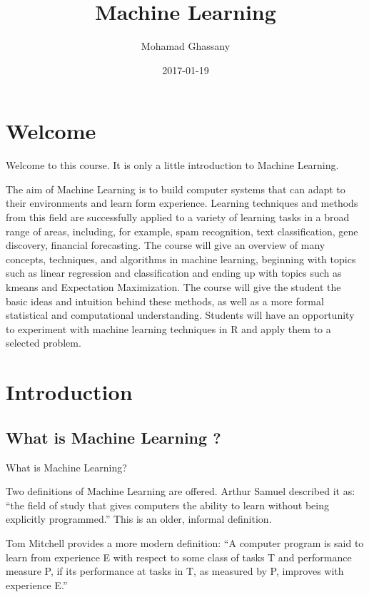\documentclass[]{book}
\title{Machine Learning}
\author{Mohamad Ghassany}
\date{2017-01-19}
\begin{document}
\maketitle

{
\setcounter{tocdepth}{2}
\tableofcontents
}
\chapter*{Welcome}\label{welcome}

Welcome to this course. It is only a little introduction to Machine
Learning.

The aim of Machine Learning is to build computer systems that can adapt
to their environments and learn form experience. Learning techniques and
methods from this field are successfully applied to a variety of
learning tasks in a broad range of areas, including, for example, spam
recognition, text classification, gene discovery, financial forecasting.
The course will give an overview of many concepts, techniques, and
algorithms in machine learning, beginning with topics such as linear
regression and classification and ending up with topics such as kmeans
and Expectation Maximization. The course will give the student the basic
ideas and intuition behind these methods, as well as a more formal
statistical and computational understanding. Students will have an
opportunity to experiment with machine learning techniques in R and
apply them to a selected problem.

\chapter*{Introduction}\label{introduction}

\section*{What is Machine Learning ?}\label{what-is-machine-learning}

What is Machine Learning?

Two definitions of Machine Learning are offered. Arthur Samuel described
it as: ``the field of study that gives computers the ability to learn
without being explicitly programmed.'' This is an older, informal
definition.

Tom Mitchell provides a more modern definition: ``A computer program is
said to learn from experience E with respect to some class of tasks T
and performance measure P, if its performance at tasks in T, as measured
by P, improves with experience E.''
\end{document}

